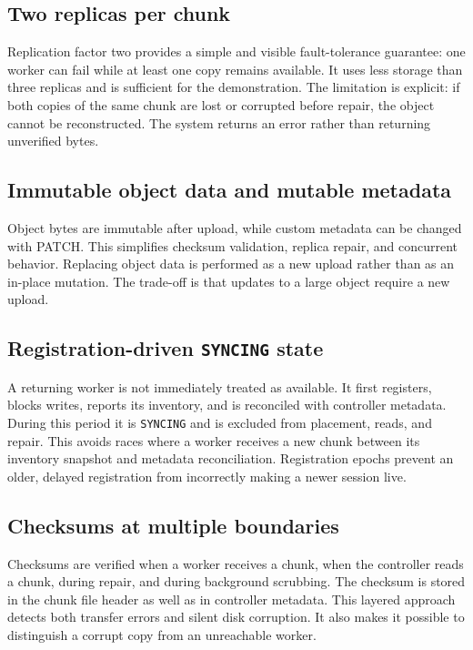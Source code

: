 \documentclass[11pt,a4paper]{article}
\begin{document}
\subsection{Two replicas per chunk}
Replication factor two provides a simple and visible fault-tolerance guarantee: one worker can fail while at least one copy remains available. It uses less storage than three replicas and is sufficient for the demonstration. The limitation is explicit: if both copies of the same chunk are lost or corrupted before repair, the object cannot be reconstructed. The system returns an error rather than returning unverified bytes.

\subsection{Immutable object data and mutable metadata}
Object bytes are immutable after upload, while custom metadata can be changed with PATCH. This simplifies checksum validation, replica repair, and concurrent behavior. Replacing object data is performed as a new upload rather than as an in-place mutation. The trade-off is that updates to a large object require a new upload.

\subsection{Registration-driven \texttt{SYNCING} state}
A returning worker is not immediately treated as available. It first registers, blocks writes, reports its inventory, and is reconciled with controller metadata. During this period it is \texttt{SYNCING} and is excluded from placement, reads, and repair. This avoids races where a worker receives a new chunk between its inventory snapshot and metadata reconciliation. Registration epochs prevent an older, delayed registration from incorrectly making a newer session live.

\subsection{Checksums at multiple boundaries}
Checksums are verified when a worker receives a chunk, when the controller reads a chunk, during repair, and during background scrubbing. The checksum is stored in the chunk file header as well as in controller metadata. This layered approach detects both transfer errors and silent disk corruption. It also makes it possible to distinguish a corrupt copy from an unreachable worker.
\end{document}
